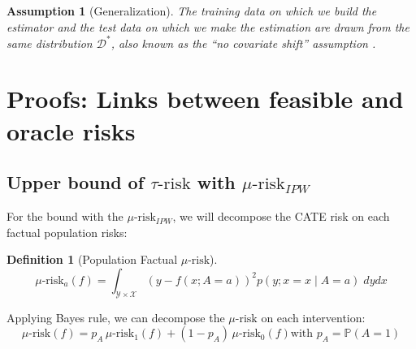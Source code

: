 \documentclass[10pt]{article}
\newtheorem{definition}{Definition}
\newtheorem{assumption}{Assumption}
\begin{document}
\begin{assumption}[Generalization]\label{assumption:generalization} The training
    data on which we build the estimator and the test data on which we make the
    estimation are drawn from the same distribution $\mathcal D^*$, also known as
    the ``no covariate shift'' assumption \cite{jesson_identifying_2020}.
\end{assumption}

\section{Proofs: Links between feasible and oracle risks}\label{apd:proofs}

\subsection{Upper bound of $\tau\text{-risk}$ with
    $\mu\text{-risk}_{IPW}$}\label{apd:proofs:mu_risk_ipw_bound}

For the bound with the $\mu\text{-risk}_{IPW}$, we will decompose the CATE risk
on each factual population risks:

\begin{definition}[Population Factual $\mu\text{-risk}$]\label{mu_risk_a}
    \cite{shalit_estimating_2017}
    \begin{equation*}
        \mu\text{-risk}_{a}(f)= \int_{\mathcal Y \times \mathcal X} (y-f(x ; A=a))^{2}  p(y ; x=x \mid A=a) \; dy dx
    \end{equation*}
\end{definition}

Applying Bayes rule, we can decompose the $\mu\text{-risk}$ on each
intervention:
\begin{equation*}
    \mu\text{-risk}(f)
    =p_{A} \,\mu\text{-risk}_{1}(f)+\left(1-p_{A}\right) \,\mu\text{-risk}_{0}(f)
    \text{with } p_A=\mathbb P(A=1)
\end{equation*}
\end{document}
